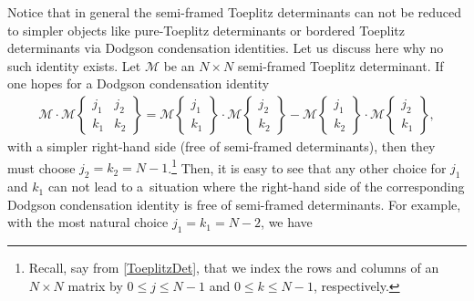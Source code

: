 \documentclass[10pt,a4paper]{amsart}
\numberwithin{equation}{section}
\begin{document}
		Notice that in general the semi-framed Toeplitz determinants can not be reduced to simpler objects like pure-Toeplitz determinants or bordered Toeplitz determinants via Dodgson condensation identities. Let us discuss here why no such identity exists. Let $\mathscr{M}$ be an $N \times N$ semi-framed Toeplitz determinant. If one hopes for a Dodgson condensation identity
		\begin{gather*}%
			\mathscr{M} \cdot \mathscr{M}\left\lbrace \begin{matrix} j_1 & j_2 \\ k_1& k_2 \end{matrix} \right\rbrace = \mathscr{M}\left\lbrace \begin{matrix} j_1 \\ k_1 \end{matrix} \right\rbrace \cdot \mathscr{M}\left\lbrace \begin{matrix} j_2 \\ k_2 \end{matrix} \right\rbrace - \mathscr{M}\left\lbrace \begin{matrix} j_1 \\ k_2 \end{matrix} \right\rbrace \cdot \mathscr{M}\left\lbrace \begin{matrix} j_2 \\ k_1 \end{matrix} \right\rbrace,
		\end{gather*}
		with a simpler right-hand side (free of semi-framed determinants), then they must choose $j_2=k_2=N-1$.\footnote{Recall, say from \eqref{ToeplitzDet}, that we index the rows and columns of an $N\times N$ matrix by $0 \leq j \leq N-1$ and $0 \leq k \leq N-1$, respectively.} Then, it is easy to see that any other choice for $j_1$ and $k_1$ can not lead to a~situation where the right-hand side of the corresponding Dodgson condensation identity is free of semi-framed determinants. For example, with the most natural choice $j_1=k_1=N-2$, we have
\end{document}
